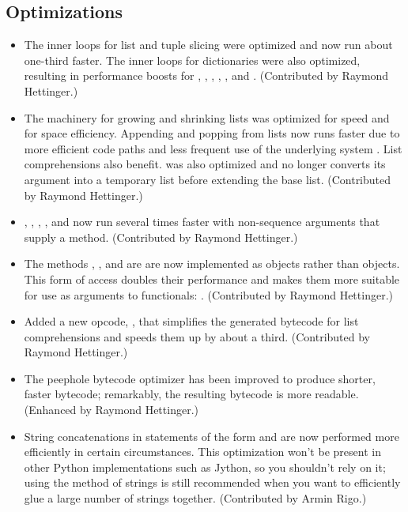 \documentclass{howto}
\begin{document}
\subsection{Optimizations}

\begin{itemize}

\item The inner loops for list and tuple slicing
 were optimized and now run about one-third faster.  The inner loops
 for dictionaries were also optimized, resulting in performance boosts for
 , , ,
 , , and .
 (Contributed by Raymond Hettinger.)

\item The machinery for growing and shrinking lists was optimized for
 speed and for space efficiency.  Appending and popping from lists now
 runs faster due to more efficient code paths and less frequent use of
 the underlying system .  List comprehensions
 also benefit.    was also optimized and no
 longer converts its argument into a temporary list before extending
 the base list.  (Contributed by Raymond Hettinger.)

\item {}, , ,
  , and  now run several times
  faster with non-sequence arguments that supply a 
  method.  (Contributed by Raymond Hettinger.)

\item The methods ,
  , and  are
  are now implemented as  objects rather
  than  objects.  This form of 
  access doubles their performance and makes them more suitable for
  use as arguments to functionals:
  .
  (Contributed by Raymond Hettinger.)

\item Added a new opcode, , that simplifies
  the generated bytecode for list comprehensions and speeds them up
  by about a third.  (Contributed by Raymond Hettinger.)

\item The peephole bytecode optimizer has been improved to 
produce shorter, faster bytecode; remarkably, the resulting bytecode is 
more readable.  (Enhanced by Raymond Hettinger.)

\item String concatenations in statements of the form  and  are now performed more efficiently in
certain circumstances.  This optimization won't be present in other
Python implementations such as Jython, so you shouldn't rely on it;
using the  method of strings is still recommended when
you want to efficiently glue a large number of strings together.
(Contributed by Armin Rigo.)       

\end{itemize}
\end{document}
